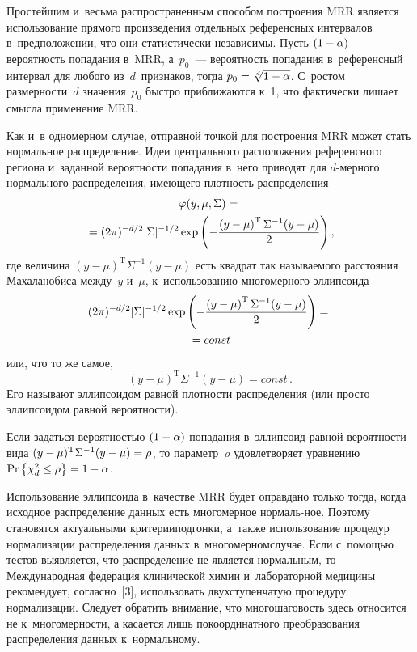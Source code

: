 \begin{multicols}{2}
     Простейшим и~весьма распространенным способом построения MRR 
является использование прямого произведения отдельных референсных 
интервалов в~предположении, что они статистически независимы. Пусть 
$(1\hm-\alpha)$~--- вероятность попадания в~MRR, а~$p_0$~--- вероятность 
попадания в~референсный интервал для любого из~$d$~признаков, тогда 
$p_0\hm= \sqrt[d]{1-\alpha}$. С~ростом размерности~$d$ значения~$p_0$ 
быстро приближаются к~1, что фактически лишает смысла применение MRR.
     
     Как и~в одномерном случае, отправной точкой для построения MRR 
может стать нормальное распределение. Идеи центрального расположения 
референсного региона и~заданной вероятности попадания в~него приводят для 
$d$-мер\-но\-го нормального распределения, имеющего плотность 
распределения
     \begin{multline*}
     \varphi(y,\mu,\Sigma) ={}\\
     {}=(2\pi)^{-d/2}\vert\Sigma\vert^{-1/2}\exp \left( -\displaystyle\frac{\displaystyle \left(y-
\mu\right)^{\mathrm{T}} \Sigma^{-1}(y-\mu)\mathstrut}{\displaystyle 2\mathstrut}\right),
   \end{multline*}
где величина $(y-\mu)^{\mathrm{T}} \Sigma^{-1} (y-\mu)$ есть квадрат так 
называемого расстояния Махаланобиса между~$y$ и~$\mu$, к~использованию 
многомерного эллипсоида
\begin{multline*}
(2\pi)^{-d/2}\vert\Sigma\vert^{-1/2}\exp \left( -\displaystyle\frac{\displaystyle \left(y-\mu\right)^{\mathrm{T}}
\Sigma^{-1} 
(y-\mu)\mathstrut}{\displaystyle 2\mathstrut}\right) ={}\\
{}=const
\end{multline*}
или, что то же самое, 
$$ 
(y-\mu)^{\mathrm{T}} \Sigma^{-1}(y-\mu)=const\,.
$$
Его называют эллипсоидом равной плотности распределения (или просто 
эллипсоидом равной вероятности). 
     
     Если задаться вероятностью $(1\hm-\alpha)$ попадания в~эллипсоид 
равной вероятности вида $(y\hm-\mu)^{\mathrm{T}}\Sigma^{-1} (y\hm-\mu)\hm= 
\rho$, то параметр~$\rho$ удовлетворяет уравнению $\mathrm{Pr}\left\{ 
\chi_d^2\leq \rho\right\} \hm=1\hm-\alpha$.
     
     Использование эллипсоида в~качестве MRR будет оправдано только 
тогда, когда исходное распределение данных есть многомерное нормаль-\linebreak ное. 
Поэтому становятся актуальными критерии\linebreak подгонки, а~также использование 
процедур норма\-ли\-зации распределения данных в~многомерном\linebreak случае.
 Если 
с~помощью тестов выявляется, что распределение не является нормальным, то 
Международная федерация клинической химии и~лабораторной медицины 
рекомендует, согласно~[3], использовать двухступенчатую процедуру 
нормализации. Следует обратить внимание, что многошаговость здесь 
относится не к~многомерности, а касается лишь покоординатного 
преобразования распределения данных к~нормальному.
     

\end{multicols}
